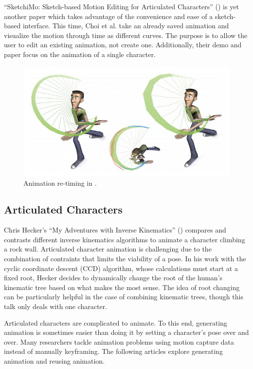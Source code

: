 ``SketchiMo: Sketch-based Motion Editing for Articulated Characters'' (\citep{choi2016sketchimo}) is yet another paper which takes advantage of the convenience and ease of a sketch-based interface. This time,  Choi et al. take an already saved animation and visualize the motion through time as different curves. The purpose is to allow the user to edit an existing animation, not create one. Additionally, their demo and paper focus on the animation of a single character.

\begin{figure}[!h]
\centering
\includegraphics[scale=0.5]{img/sketchimo}
\caption{Animation re-timing in \citep{choi2016sketchimo}.}
\end{figure}

\subsection{Articulated Characters}
Chris Hecker's ``My Adventures with Inverse Kinematics'' (\citep{hecker2002my}) compares and contrasts different inverse kinematics algorithms to animate a character climbing a rock wall. Articulated character animation is challenging due to the combination of contraints that limits the viability of a pose. In his work with the  cyclic coordinate descent (CCD) algorithm, whose calculations must start at a fixed root, Hecker decides to dynamically change the root of the human's kinematic tree based on what makes the most sense. The idea of root changing can be particularly helpful in the case of combining kinematic trees, though this talk only deals with one character.

Articulated characters are complicated to animate. To this end, generating animation is sometimes easier than doing it by setting a character's pose over and over. Many researchers tackle animation problems using motion capture data instead of manually keyframing. The following articles explore generating animation and reusing animation.

